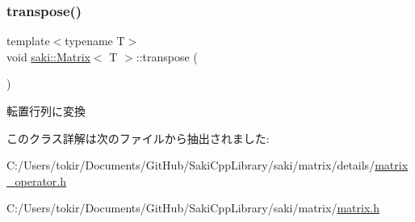 \subsubsection{\texorpdfstring{transpose()}{transpose()}}
{\footnotesize\ttfamily template$<$typename T$>$ \\
void \mbox{\hyperlink{classsaki_1_1_matrix}{saki\+::\+Matrix}}$<$ T $>$\+::transpose (\begin{DoxyParamCaption}{ }\end{DoxyParamCaption})\hspace{0.3cm}{\ttfamily [inline]}}



転置行列に変換 



このクラス詳解は次のファイルから抽出されました\+:\begin{DoxyCompactItemize}
\item 
C\+:/\+Users/tokir/\+Documents/\+Git\+Hub/\+Saki\+Cpp\+Library/saki/matrix/details/\mbox{\hyperlink{matrix__operator_8h}{matrix\+\_\+operator.\+h}}\item 
C\+:/\+Users/tokir/\+Documents/\+Git\+Hub/\+Saki\+Cpp\+Library/saki/matrix/\mbox{\hyperlink{matrix_8h}{matrix.\+h}}\end{DoxyCompactItemize}
